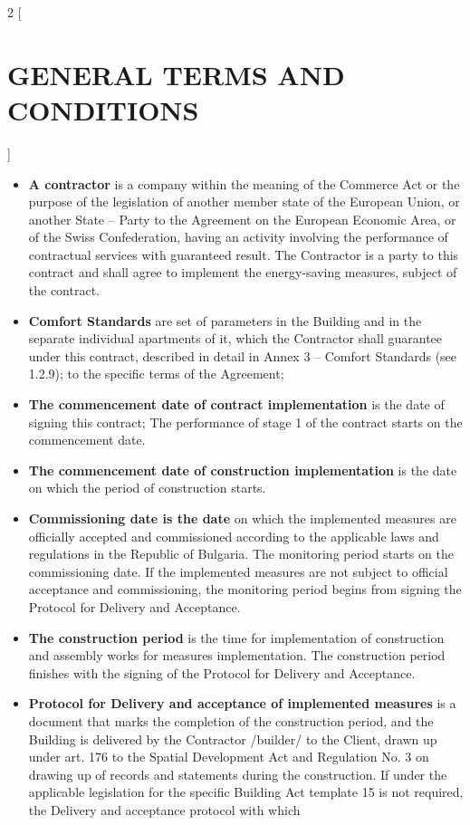 \begin{multicols}{2} [\section{GENERAL TERMS AND CONDITIONS}]
\begin{itemize}[label={}]
    Building.
  \item\textbf{A contractor} is a company within the meaning of the
    Commerce Act or the purpose of the legislation of another member
    state of the European Union, or another State – Party to the
    Agreement on the European Economic Area, or of the Swiss
    Confederation, having an activity involving the performance of
    contractual services with guaranteed result. The Contractor is a
    party to this contract and shall agree to implement the
    energy-saving measures, subject of the contract.
  \item\textbf{Comfort Standards} are set of parameters in the
    Building and in the separate individual apartments of it, which
    the Contractor shall guarantee under this contract, described in
    detail in Annex 3 – Comfort Standards (see 1.2.9); to the specific
    terms of the Agreement;
  \item\textbf{The commencement date of contract implementation} is
    the date of signing this contract; The performance of stage 1 of
    the contract starts on the commencement date.
  \item\textbf{The commencement date of construction implementation}
    is the date on which the period of construction starts.
  \item\textbf{Commissioning date is the date} on which the
    implemented measures are officially accepted and commissioned
    according to the applicable laws and regulations in the Republic
    of Bulgaria. The monitoring period starts on the commissioning
    date. If the implemented measures are not subject to official
    acceptance and commissioning, the monitoring period begins from
    signing the Protocol for Delivery and Acceptance.
  \item\textbf{The construction period} is the time for implementation
    of construction and assembly works for measures
    implementation. The construction period finishes with the signing
    of the Protocol for Delivery and Acceptance.
  \item\textbf{Protocol for Delivery and acceptance of implemented
      measures} is a document that marks the completion of the
    construction period, and the Building is delivered by the
    Contractor /builder/ to the Client, drawn up under art. 176 to the
    Spatial Development Act and Regulation No. 3 on drawing up of
    records and statements during the construction. If under the
    applicable legislation for the specific Building Act template 15
    is not required, the Delivery and acceptance protocol with which

\end{itemize}
\end{multicols}
